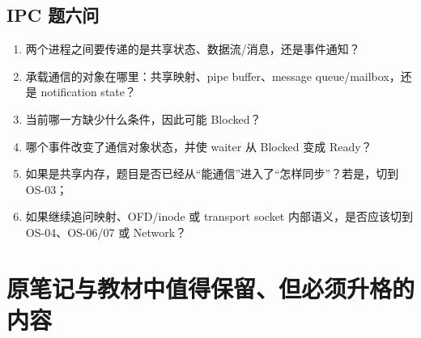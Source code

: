 \documentclass[11pt,a4paper]{ctexart}
\begin{document}
\subsection{IPC 题六问}
\begin{enumerate}
\item 两个进程之间要传递的是共享状态、数据流/消息，还是事件通知？
\item 承载通信的对象在哪里：共享映射、pipe buffer、message queue/mailbox，还是 notification state？
\item 当前哪一方缺少什么条件，因此可能 Blocked？
\item 哪个事件改变了通信对象状态，并使 waiter 从 Blocked 变成 Ready？
\item 如果是共享内存，题目是否已经从“能通信”进入了“怎样同步”？若是，切到 OS-03；
\item 如果继续追问映射、OFD/inode 或 transport socket 内部语义，是否应该切到 OS-04、OS-06/07 或 Network？
\end{enumerate}

\section{原笔记与教材中值得保留、但必须升格的内容}
\end{document}

